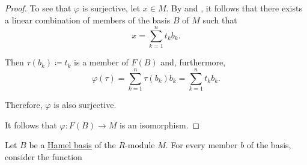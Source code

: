 \begin{proof}
  To see that \( \varphi \) is surjective, let \( x \in M \). By  and , it follows that there exists a linear combination of members of the basis \( B \) of \( M \) such that
  \begin{equation*}
    x = \sum_{k=1}^n t_k b_k.
  \end{equation*}

  Then \( \tau(b_k) \coloneqq t_k \) is a member of \( F(B) \) and, furthermore,
  \begin{equation*}
    \varphi(\tau) = \sum_{k=1}^n \tau(b_k) b_k = \sum_{k=1}^n t_k b_k.
  \end{equation*}

  Therefore, \( \varphi \) is also surjective.

  It follows that \( \varphi: F(B) \to M \) is an isomorphism.
\end{proof}

\begin{definition}\label{thm:hamel_basis_decomposition}
  Let \( B \) be a \hyperref[def:semimodule_basis/independent]{Hamel basis} of the \( R \)-module \( M \). For every member \( b \) of the basis, consider the function
\end{definition}

